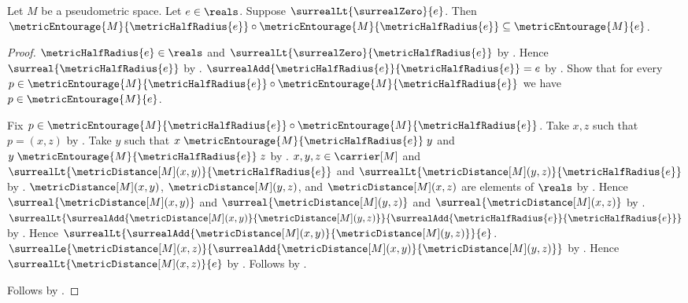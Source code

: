 \begin{proposition}\label{metric_entourage_half_square}
    Let $M$ be a pseudometric space.
    Let $e\in\reals$.
    Suppose $\surrealLt{\surrealZero}{e}$.
    Then
        $\metricEntourage{M}{\metricHalfRadius{e}}
            \circ\metricEntourage{M}{\metricHalfRadius{e}}
        \subseteq\metricEntourage{M}{e}$.
\end{proposition}
\begin{proof}
    $\metricHalfRadius{e}\in\reals$ and
        $\surrealLt{\surrealZero}{\metricHalfRadius{e}}$
        by .
    Hence $\surreal{\metricHalfRadius{e}}$
        by .
    $\surrealAdd{\metricHalfRadius{e}}{\metricHalfRadius{e}}=e$
        by .
    Show that for every
        $p\in
            \metricEntourage{M}{\metricHalfRadius{e}}
                \circ\metricEntourage{M}{\metricHalfRadius{e}}$
        we have $p\in\metricEntourage{M}{e}$.
    \begin{subproof}
        Fix
            $p\in
                \metricEntourage{M}{\metricHalfRadius{e}}
                    \circ\metricEntourage{M}{\metricHalfRadius{e}}$.
        Take $x,z$ such that $p=(x,z)$
            by .
        Take $y$ such that
            $x\mathrel{\metricEntourage{M}{\metricHalfRadius{e}}}y$
            and
            $y\mathrel{\metricEntourage{M}{\metricHalfRadius{e}}}z$
            by .
        $x,y,z\in\carrier[M]$ and
            $\surrealLt{\metricDistance[M](x,y)}
                {\metricHalfRadius{e}}$ and
            $\surrealLt{\metricDistance[M](y,z)}
                {\metricHalfRadius{e}}$
            by .
        $\metricDistance[M](x,y)$,
            $\metricDistance[M](y,z)$, and
            $\metricDistance[M](x,z)$ are elements of $\reals$
            by .
        Hence $\surreal{\metricDistance[M](x,y)}$ and
            $\surreal{\metricDistance[M](y,z)}$ and
            $\surreal{\metricDistance[M](x,z)}$
            by .
        $\surrealLt
            {\surrealAdd{\metricDistance[M](x,y)}
                {\metricDistance[M](y,z)}}
            {\surrealAdd{\metricHalfRadius{e}}{\metricHalfRadius{e}}}$
            by .
        Hence
            $\surrealLt
                {\surrealAdd{\metricDistance[M](x,y)}
                    {\metricDistance[M](y,z)}}{e}$.
        $\surrealLe{\metricDistance[M](x,z)}
            {\surrealAdd{\metricDistance[M](x,y)}
                {\metricDistance[M](y,z)}}$
            by .
        Hence $\surrealLt{\metricDistance[M](x,z)}{e}$
            by .
        Follows by .
    \end{subproof}
    Follows by .
\end{proof}

